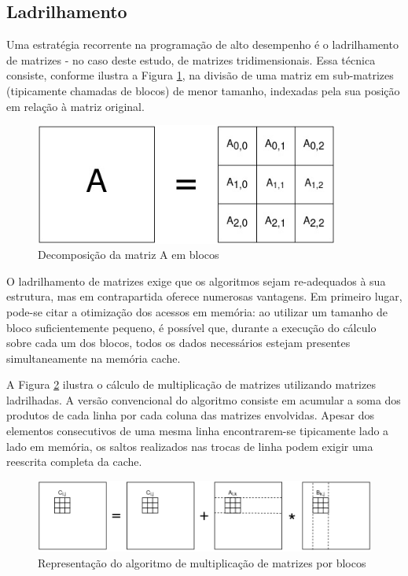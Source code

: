 \documentclass[cic,tc]{iiufrgs}
\begin{document}
\subsection{Ladrilhamento}

Uma estratégia recorrente na programação de alto desempenho é o ladrilhamento de matrizes - no caso deste estudo, de matrizes tridimensionais. Essa técnica consiste, conforme ilustra a Figura \ref{fig:tiled_matrix},
na divisão de uma matriz em sub-matrizes (tipicamente chamadas de blocos) de menor tamanho, indexadas pela sua posição em relação à matriz original.

\begin{figure}[!htb]
    \caption{Decomposição da matriz A em blocos}
    \begin{center}
      \includegraphics[width=27em]{tiled_matrix}
    \end{center}
    \label{fig:tiled_matrix}
\end{figure}

O ladrilhamento de matrizes exige que os algoritmos sejam re-adequados à sua estrutura, mas em contrapartida oferece numerosas vantagens. Em primeiro lugar, pode-se citar a
otimização dos acessos em memória: ao utilizar um tamanho de bloco suficientemente pequeno, é possível que, durante a execução do cálculo sobre cada um dos blocos, todos os dados
necessários estejam presentes simultaneamente na memória cache.

A Figura \ref{fig:gemm} ilustra o cálculo de multiplicação de matrizes utilizando matrizes ladrilhadas. A versão convencional do algoritmo consiste em acumular a soma dos produtos de
cada linha por cada coluna das matrizes envolvidas. Apesar dos elementos consecutivos de uma mesma linha encontrarem-se tipicamente lado a lado em memória, os saltos realizados nas trocas
de linha podem exigir uma reescrita completa da cache.

\begin{figure}[!htb]
    \caption{Representação do algoritmo de multiplicação de matrizes por blocos}
    \begin{center}
      \includegraphics[width=35em]{gemm}
    \end{center}
    \label{fig:gemm}
\end{figure}
\end{document}
